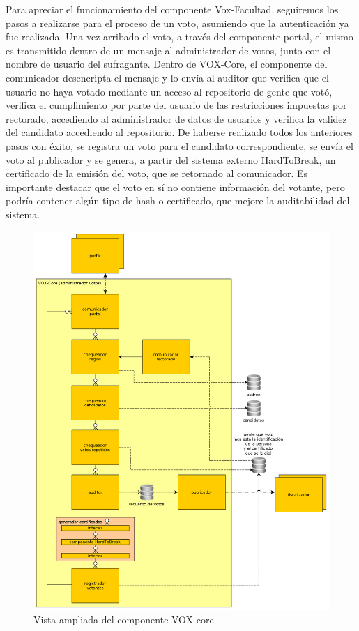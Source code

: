 Para apreciar el funcionamiento del componente Vox-Facultad, seguiremos los pasos a realizarse para el proceso de un voto, asumiendo que la autenticación ya fue realizada. Una vez arribado el voto, a través del componente portal, el mismo es transmitido dentro de un mensaje al administrador de votos, junto con el nombre de usuario del sufragante. Dentro de VOX-Core, el componente del comunicador desencripta el mensaje y lo envía al auditor que verifica que el usuario no haya votado mediante un acceso al repositorio de gente que votó, verifica el cumplimiento por parte del usuario de las restricciones impuestas por rectorado, accediendo al administrador de datos de usuarios %
y verifica la validez del candidato accediendo al repositorio. %
De haberse realizado todos los anteriores pasos con éxito, se registra un voto para el candidato correspondiente, se envía el voto al publicador y se genera, a partir del sistema externo HardToBreak, un certificado de la emisión del voto, que se retornado al comunicador. Es importante destacar que el voto en sí no contiene información del votante, pero podría contener algún tipo de hash o certificado, que mejore la auditabilidad del sistema. 
 
\begin{figure}[H]
	\begin{center}
		\includegraphics[scale=0.26]{../diagramas/voxcore.png}
		\caption{Vista ampliada del componente VOX-core}
	\end{center} 
\end{figure} 
 
